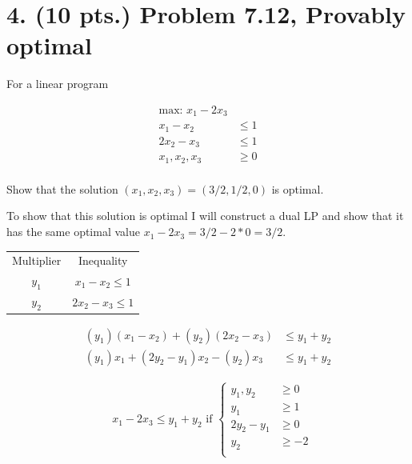 \documentclass[11pt]{article}
\begin{document}
\newpage

\section*{4.  (10 pts.) Problem 7.12, Provably optimal}

For a linear program

\begin{equation*}
  \begin{aligned}
    \mbox{max: } x_1-2x_3\\
    x_1-x_2 &\leq 1\\
    2x_2-x_3 &\leq 1\\
    x_1,x_2,x_3 & \geq 0\\
  \end{aligned}
\end{equation*}

Show that the solution $(x_1,x_2,x_3)=(3/2,1/2,0)$ is optimal.

To show that this solution is optimal I will construct a dual LP and show that
it has the same optimal value $x_1-2x_3=3/2-2*0=3/2$.

{
  \centering
  \begin{tabular}{c | c}
    Multiplier & Inequality\\
    $y_1$ & $x_1-x_2 \leq 1$\\
    $y_2$ & $2x_2-x_3 \leq 1$\\
  \end{tabular}\par
}

\begin{equation*}
  \begin{aligned}
    (y_1)(x_1-x_2) + (y_2)(2x_2-x_3) &\leq y_1+y_2\\
    (y_1)x_1+(2y_2-y_1)x_2-(y_2)x_3 & \leq y_1+y_2
  \end{aligned}
\end{equation*}

\begin{equation*}
  \begin{aligned}
    &x_1-2x_3 \leq y_1+y_2 \mbox{ if } \left\{  
      \begin{array}{lr}
        y_1,y_2 &\geq 0 \\
        y_1 &\geq 1 \\
        2y_2-y_1 &\geq 0\\
        y_2 &\geq -2 \\
      \end{array}
    \right. 
   \end{aligned}
\end{equation*}
\end{document}
